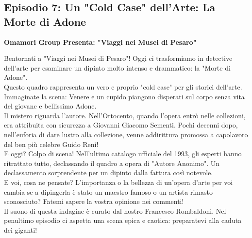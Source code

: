 \documentclass[hidelinks,12pt,a4paper]{article}
\begin{document}
\begin{flushleft}
		\subsection{Episodio 7: Un "Cold Case" dell'Arte: La Morte di Adone}
		\begin{center}
			\textbf{Omamori Group Presenta: "Viaggi nei Musei di Pesaro"}
		\end{center}
		Bentornati a "Viaggi nei Musei di Pesaro"! Oggi ci trasformiamo in detective dell'arte per esaminare un dipinto molto intenso e drammatico: la "Morte di Adone".\\
		Questo quadro rappresenta un vero e proprio "cold case" per gli storici dell'arte. Immaginate la scena: Venere e un cupido piangono disperati sul corpo senza vita del giovane e bellissimo Adone.\\
		Il mistero riguarda l'autore. Nell'Ottocento, quando l'opera entrò nelle collezioni, era attribuita con sicurezza a Giovanni Giacomo Sementi. Pochi decenni dopo, nell'euforia di dare lustro alla collezione, venne addirittura promossa a capolavoro del ben più celebre Guido Reni!\\
		E oggi? Colpo di scena! Nell'ultimo catalogo ufficiale del 1993, gli esperti hanno ritrattato tutto, declassando il quadro a opera di "Autore Anonimo". Un declassamento sorprendente per un dipinto dalla fattura così notevole.\\
		E voi, cosa ne pensate? L'importanza o la bellezza di un'opera d'arte per voi cambia se a dipingerla è stato un maestro famoso o un artista rimasto sconosciuto? Fatemi sapere la vostra opinione nei commenti!\\
		Il suono di questa indagine è curato dal nostro Francesco Rombaldoni. Nel penultimo episodio ci aspetta una scena epica e caotica: preparatevi alla caduta dei giganti!\\
		

\end{flushleft}
\end{document}
